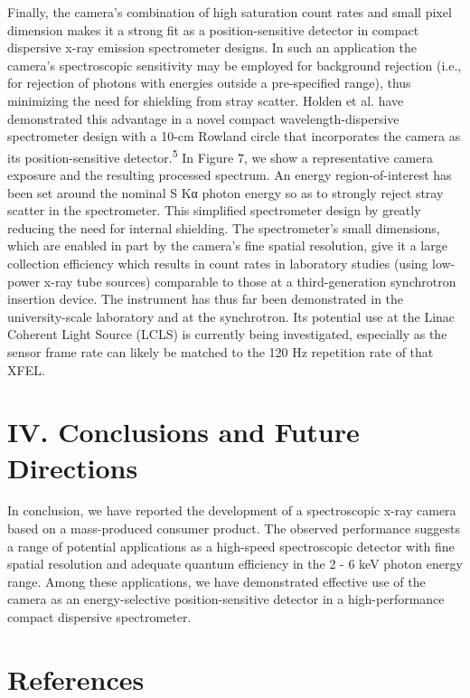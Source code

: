 \FloatBarrier

Finally, the camera's combination of high saturation count rates and
small pixel dimension makes it a strong fit as a position-sensitive
detector in compact dispersive x-ray emission spectrometer designs. In
such an application the camera's spectroscopic sensitivity may be
employed for background rejection (i.e., for rejection of photons with
energies outside a pre-specified range), thus minimizing the need for
shielding from stray scatter. Holden et al. have demonstrated this
advantage in a novel compact wavelength-dispersive spectrometer design
with a 10-cm Rowland circle that incorporates the camera as its
position-sensitive detector.\textsuperscript{5} In Figure 7, we show a
representative camera exposure and the resulting processed spectrum. An
energy region-of-interest has been set around the nominal S Kα photon
energy so as to strongly reject stray scatter in the spectrometer. This
simplified spectrometer design by greatly reducing the need for internal
shielding. The spectrometer's small dimensions, which are enabled in
part by the camera's fine spatial resolution, give it a large collection
efficiency which results in count rates in laboratory studies (using
low-power x-ray tube sources) comparable to those at a third-generation
synchrotron insertion device. The instrument has thus far been
demonstrated in the university-scale laboratory and at the synchrotron.
Its potential use at the Linac Coherent Light Source (LCLS) is currently
being investigated, especially as the sensor frame rate can likely be
matched to the 120 Hz repetition rate of that XFEL.

\section{IV. Conclusions and Future Directions}

In conclusion, we have reported the development of a spectroscopic x-ray
camera based on a mass-produced consumer product. The observed
performance suggests a range of potential applications as a high-speed
spectroscopic detector with fine spatial resolution and adequate quantum
efficiency in the 2 - 6 keV photon energy range. Among these
applications, we have demonstrated effective use of the camera as an
energy-selective position-sensitive detector in a high-performance
compact dispersive spectrometer.

\section{References}

